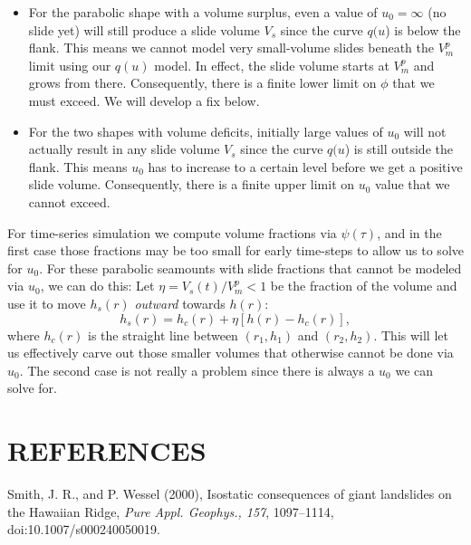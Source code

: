 \documentclass[12pt,letterpaper,margin=0.5in]{report}
\begin{document}
\begin{itemize}
  \item For the parabolic shape with a volume surplus, even a value of $u_0 = \infty$ (no slide yet) will still
  produce a slide volume $V_s$ since the curve $q(u$) is below the flank.  This means we cannot model very small-volume
  slides beneath the $V_m^p$ limit using our $q(u)$ model. In effect, the slide volume starts at $V_m^p$ and grows from there.
  Consequently, there is a finite lower limit on $\phi$ that we must exceed.  We will develop a fix below.
  \item For the two shapes with volume deficits, initially large values of $u_0$ will not actually result in any slide
  volume $V_s$ since the curve $q(u$) is still outside the flank. This means $u_0$ has to increase to a certain level
  before we get a positive slide volume. Consequently, there is a finite upper limit on $u_0$ value that we cannot exceed.
\end{itemize}

For time-series simulation we compute volume fractions via $\psi(\tau)$, and in the first case those fractions may
be too small for early time-steps to allow us to solve for $u_0$. For these parabolic seamounts with slide fractions
that cannot be modeled via $u_0$, we can do this: Let $\eta = V_s(t)/V_m^p < 1$ be the fraction of the volume and use it to move
$h_s(r)$ \emph{outward} towards $h(r)$:
\begin{equation}
h_s(r) = h_c(r) + \eta \left [h(r) - h_c(r) \right ],
\end{equation}
where $h_c(r)$ is the straight line between $(r_1, h_1)$ and $(r_2, h_2)$.  This will let us effectively carve out
those smaller volumes that otherwise cannot be done via $u_0$.  The second case is not really a problem since there is
always a $u_0$ we can solve for.

\section{REFERENCES}

Smith, J. R., and P. Wessel (2000), Isostatic consequences of giant landslides on the Hawaiian Ridge,
{\it Pure Appl. Geophys., 157}, 1097--1114, doi:10.1007/s000240050019.
\end{document}
